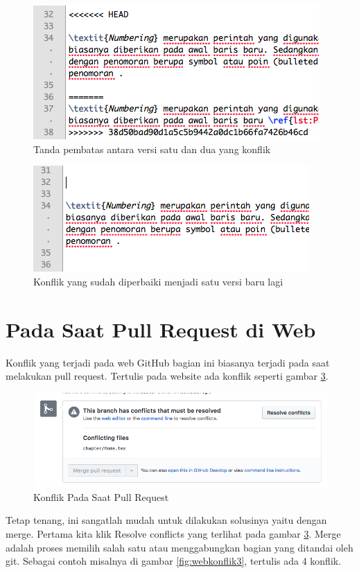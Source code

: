 \begin{figure}[!htbp]
\centerline{\includegraphics[width=.75\textwidth]{Figures/konfliksebelum}}
\caption{Tanda pembatas antara versi satu dan dua yang konflik}
\label{fig:konfliksebelum}
\end{figure}

\begin{figure}[!htbp]
\centerline{\includegraphics[width=.75\textwidth]{Figures/konfliksesudah}}
\caption{Konflik yang sudah diperbaiki menjadi satu versi baru lagi}
\label{fig:konfliksesudah}
\end{figure}


\section{Pada Saat Pull Request di Web}
Konflik yang terjadi pada web GitHub bagian ini biasanya terjadi pada saat melakukan pull request. Tertulis pada website ada konflik seperti gambar \ref{fig:webkonflik1}.

\begin{figure}[!htbp]
\centerline{\includegraphics[width=.75\textwidth]{Figures/webkonflik1}}
\caption{Konflik Pada Saat Pull Request}
\label{fig:webkonflik1}
\end{figure}

Tetap tenang, ini sangatlah mudah untuk dilakukan solusinya yaitu dengan merge. Pertama kita klik Resolve conflicts yang terlihat pada gambar \ref{fig:webkonflik1}. Merge adalah proses memilih salah satu atau menggabungkan bagian yang ditandai oleh git. Sebagai contoh misalnya di gambar \ref{fig:webkonflik3}, tertulis ada 4 konflik.

